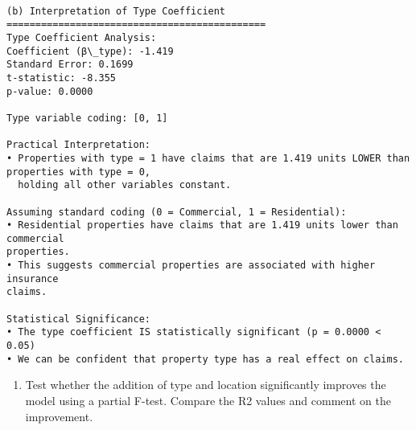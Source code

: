 \documentclass[8pt, twocolumn]{extarticle}
\providecommand{\tightlist}{%
      \setlength{\itemsep}{0pt}\setlength{\parskip}{0pt}}
\begin{document}
    \begin{Verbatim}[commandchars=\\\{\}]

(b) Interpretation of Type Coefficient
=============================================
Type Coefficient Analysis:
Coefficient (β\_type): -1.419
Standard Error: 0.1699
t-statistic: -8.355
p-value: 0.0000

Type variable coding: [0, 1]

Practical Interpretation:
• Properties with type = 1 have claims that are 1.419 units LOWER than
properties with type = 0,
  holding all other variables constant.

Assuming standard coding (0 = Commercial, 1 = Residential):
• Residential properties have claims that are 1.419 units lower than commercial
properties.
• This suggests commercial properties are associated with higher insurance
claims.

Statistical Significance:
• The type coefficient IS statistically significant (p = 0.0000 < 0.05)
• We can be confident that property type has a real effect on claims.
    \end{Verbatim}

    \begin{enumerate}
\def\labelenumi{(\alph{enumi})}
\setcounter{enumi}{2}
\tightlist
\item
  Test whether the addition of type and location significantly improves
  the model using a partial F-test. Compare the R2 values and comment on
  the improvement.
\end{enumerate}
\end{document}
